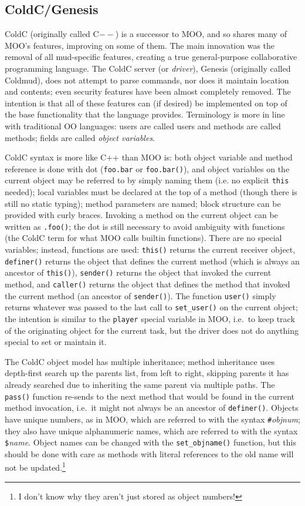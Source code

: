 \documentclass{article}
\begin{document}
\subsection{ColdC/Genesis}

ColdC (originally called C$--$) is a successor to MOO, and so shares
many of MOO's features, improving on some of them.  The main
innovation was the removal of all mud-specific features, creating a
true general-purpose collaborative programming language.  The ColdC
server (or \emph{driver}), Genesis (originally called Coldmud), does
not attempt to parse commands, nor does it maintain location and
contents; even security features have been almost completely removed.
The intention is that all of these features can (if desired) be
implemented on top of the base functionality that the language
provides.  Terminology is more in line with traditional OO languages:
users are called users and methods are called methods; fields are
called \emph{object variables}.

ColdC syntax is more like C++ than MOO is: both object variable and
method reference is done with dot (\texttt{foo.bar} or
\texttt{foo.bar()}), and object variables on the current object may be
referred to by simply naming them (i.e. no explicit \texttt{this}
needed); local variables must be declared at the top of a method
(though there is still no static typing); method parameters are named;
block structure can be provided with curly braces.  Invoking a method
on the current object can be written as \texttt{.foo()}; the dot is
still necessary to avoid ambiguity with functions (the ColdC term for
what MOO calls builtin functions).  There are no special variables;
instead, functions are used: \texttt{this()} returns the current receiver
object, \texttt{definer()} returns the object that defines the current method
(which is always an ancestor of \texttt{this()}), \texttt{sender()}
returns the object that invoked the current method, and
\texttt{caller()} returns the object that defines the method that
invoked the current method (an ancestor of \texttt{sender()}).  The
function \texttt{user()} simply returns whatever was passed to the
last call to \texttt{set\_user()} on the current object; the intention 
is similar to the \texttt{player} special variable in MOO, i.e.~to
keep track of the originating object for the current task, but the
driver does not do anything special to set or maintain it.

The ColdC object model has multiple inheritance; method inheritance
uses depth-first search up the parents list, from left to right,
skipping parents it has already searched due to inheriting
the same parent via multiple paths.  The \texttt{pass()} function
re-sends to the next method that would be found in the current method
invocation, i.e.~it might not always be an ancestor of
\texttt{definer()}.  Objects have unique numbers, as in MOO, which are 
referred to with the syntax \texttt{\#}\textit{objnum}; they also have
unique alphanumeric names, which are referred to with the syntax
\texttt{\$}\textit{name}.  Object names can be changed with the
\texttt{set\_objname()} function, but this should be done with care as 
methods with literal references to the old name will not be
updated.\footnote{I don't know why they aren't just stored as object
numbers!}
\end{document}
